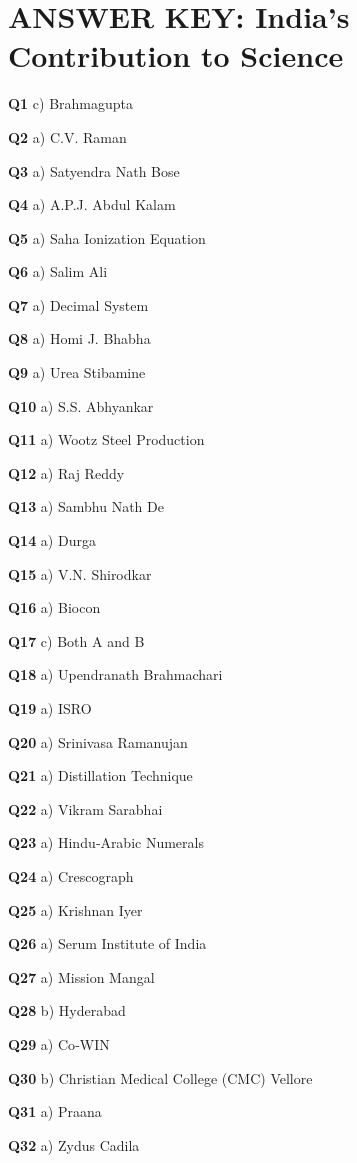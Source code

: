 \section{ANSWER KEY: India's Contribution to Science}

\textbf{Q1} c) Brahmagupta\par
\textbf{Q2} a) C.V. Raman\par
\textbf{Q3} a) Satyendra Nath Bose\par
\textbf{Q4} a) A.P.J. Abdul Kalam\par
\textbf{Q5} a) Saha Ionization Equation\par
\textbf{Q6} a) Salim Ali\par
\textbf{Q7} a) Decimal System\par
\textbf{Q8} a) Homi J. Bhabha\par
\textbf{Q9} a) Urea Stibamine\par
\textbf{Q10} a) S.S. Abhyankar\par
\textbf{Q11} a) Wootz Steel Production\par
\textbf{Q12} a) Raj Reddy\par
\textbf{Q13} a) Sambhu Nath De\par
\textbf{Q14} a) Durga\par
\textbf{Q15} a) V.N. Shirodkar\par
\textbf{Q16} a) Biocon\par
\textbf{Q17} c) Both A and B\par
\textbf{Q18} a) Upendranath Brahmachari\par
\textbf{Q19} a) ISRO\par
\textbf{Q20} a) Srinivasa Ramanujan\par
\textbf{Q21} a) Distillation Technique\par
\textbf{Q22} a) Vikram Sarabhai\par
\textbf{Q23} a) Hindu‑Arabic Numerals\par
\textbf{Q24} a) Crescograph\par
\textbf{Q25} a) Krishnan Iyer\par
\textbf{Q26} a) Serum Institute of India\par
\textbf{Q27} a) Mission Mangal\par
\textbf{Q28} b) Hyderabad\par
\textbf{Q29} a) Co‑WIN\par
\textbf{Q30} b) Christian Medical College (CMC) Vellore\par
\textbf{Q31} a) Praana\par
\textbf{Q32} a) Zydus Cadila\par
